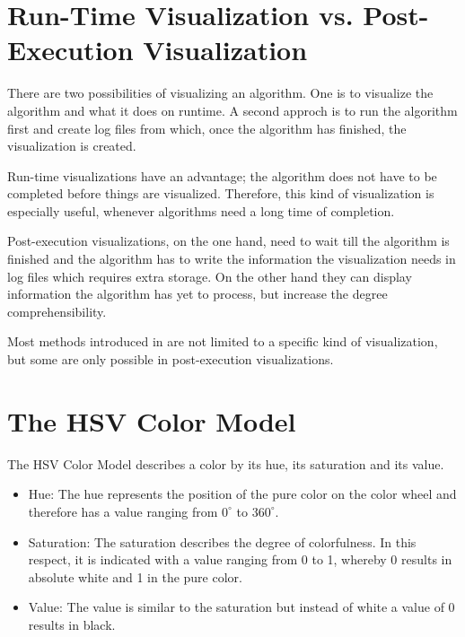 \documentclass
[
    paper = a4,
    pagesize,
    12 pt,
    oneside,                       %
    open = right,
    DIV = calc,
    BCOR = 0 mm,                   %
    bibtotoc
]
{scrbook}
\begin{document}
\section{Run-Time Visualization vs. Post-Execution Visualization}

There are two possibilities of visualizing an algorithm.
One is to visualize the algorithm and what it does on runtime.
A second approch is to run the algorithm first and create log files from which, once the algorithm has finished, the visualization is created.

Run-time visualizations have an advantage; the algorithm does not have to be completed before things are visualized.
Therefore, this kind of visualization is especially useful, whenever algorithms need a long time of completion.

Post-execution visualizations, on the one hand, need to wait till the algorithm is finished and the algorithm has to write the information the visualization needs in log files which requires extra storage.
On the other hand they can display information the algorithm has yet to process, but increase the degree comprehensibility. 

Most methods introduced in  are not limited to a specific kind of visualization, but some are only possible in post-execution visualizations.



\section{The HSV Color Model}

The HSV Color Model describes a color by its hue, its saturation and its value.
\begin{itemize}
  \item Hue: The hue represents the position of the pure color on the color wheel and therefore has a value ranging from $0^\circ$ to $360^\circ$.
  \item Saturation: The saturation describes the degree of colorfulness. In this respect, it is indicated with a value ranging from 0 to 1, whereby 0 results in absolute white and 1 in the pure color.
  \item Value: The value is similar to the saturation but instead of white a value of 0 results in black.
\end{itemize}
\end{document}
